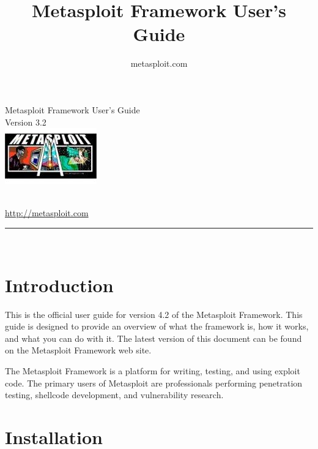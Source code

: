 \documentclass{report}
\begin{document}
\title{Metasploit Framework User's Guide}
\author{metasploit.com}

\begin{titlepage}
    \begin{center}
        \huge{Metasploit Framework User's Guide}
		\ \\[10mm]
		\large{Version 3.2}
		\\[10mm]

        \includegraphics{hacker04.jpg}
		
		\ \\[10mm]
		
        \small{\url{http://metasploit.com}}

        \rule{10cm}{1pt} \\[4mm]
        \renewcommand{\arraystretch}{0.5}
    \end{center}
\end{titlepage}

\tableofcontents

\setlength{\parindent}{0pt} \setlength{\parskip}{8pt}

\chapter{Introduction}

\par
This is the official user guide for version 4.2 of the Metasploit Framework.
This guide is designed to provide an overview of what the framework is, how it
works, and what you can do with it. The latest version of this document can be
found on the Metasploit Framework web site.

\par
The Metasploit Framework is a platform for writing, testing, and using exploit
code. The primary users of Metasploit are professionals performing penetration
testing, shellcode development, and vulnerability research.

\par
\pagebreak

\chapter{Installation}
\end{document}
